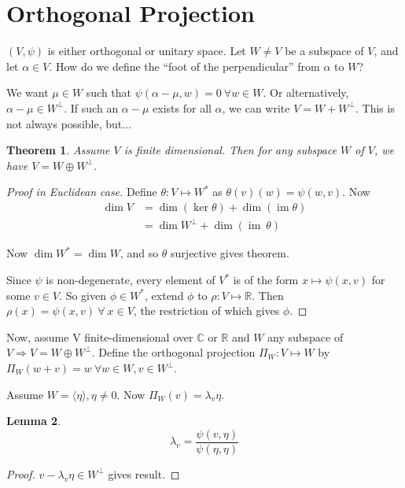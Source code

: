 \documentclass{notes}
\theoremstyle{plain}
\newtheorem{theorem}{Theorem}[chapter]
\newtheorem{lemma}[theorem]{Lemma}
\DeclareMathOperator{\im}{im}
\begin{document}
\section{Orthogonal Projection}

$(V,\psi)$ is either orthogonal or unitary space.  Let $W \ne V$ be a
subspace of $V$, and let $\alpha \in V$.  How do we define the ``foot
of the perpendicular'' from $\alpha$ to $W$?

We want $\mu \in W$ such that $\psi(\alpha-\mu,w)=0 \: \forall w \in
W$.  Or alternatively, $\alpha - \mu \in W^{\perp}$.  If such an
$\alpha-\mu$ exists for all $\alpha$, we can write $V = W +
W^{\perp}$.  This is not always possible, but...

\begin{theorem}
  Assume $V$ is finite dimensional.  Then for any subspace $W$ of $V$,
  we have $V=W \oplus W^{\perp}$.
\end{theorem}

\begin{proof}[Proof in Euclidean case]
  Define $\theta : V \mapsto W^*$ as $\theta(v)(w) = \psi(w,v)$.  Now
\begin{align*}
  \dim V &= \dim (\ker \theta) + \dim (\im \theta) \\
  &= \dim W^{\perp} + \dim (\im \: \theta)
\end{align*}

Now $\dim W^* = \dim W$, and so $\theta$ surjective gives theorem.

Since $\psi$ is non-degenerate, every element of $V^*$ is of the form
$x \mapsto \psi(x,v)$ for some $v \in V$.  So given $\phi \in W^*$,
extend $\phi$ to $\rho : V \mapsto \mathbb{R}$.  Then $\rho(x) =
\psi(x,v) \: \forall \: x \in V$, the restriction of which gives
$\phi$.
\end{proof}

Now, assume V finite-dimensional over $\mathbb{C}$ or $\mathbb{R}$ and
$W$ any subspace of $V \Rightarrow V = W \oplus W^{\perp}$.  Define
the orthogonal projection $\Pi_W : V \mapsto W$ by $\Pi_W(w+v)=w \:
\forall w \in W, v \in W^{\perp}$.

Assume $W = \langle \eta \rangle, \eta \ne 0$.  Now $\Pi_W(v) =
\lambda_v\eta$.

\begin{lemma}
\[
\lambda_v = \frac{\psi(v,\eta)}{\psi(\eta,\eta)}
\]
\end{lemma}  

\begin{proof}
  $v-\lambda_v\eta \in W^{\perp}$ gives result.
\end{proof}
\end{document}
